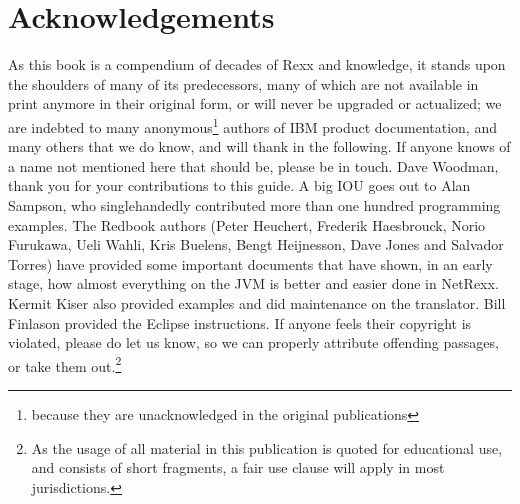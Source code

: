 \section*{Acknowledgements}
As this book is a compendium of decades of Rexx and \nr{} knowledge, it stands upon the shoulders of many of its predecessors, many of which are not available in print anymore in their original form, or will never be upgraded or actualized; we are indebted to many anonymous\footnote{because they are unacknowledged in the original publications} authors of IBM product documentation, and many others that we do know, and will thank in the following. If anyone knows of a name not mentioned here that should be, please be in touch. 
Dave Woodman, thank you for your contributions to this guide.
A big IOU goes out to Alan Sampson, who singlehandedly contributed more than one hundred \nr{} programming examples. The Redbook authors (Peter Heuchert, Frederik Haesbrouck, Norio Furukawa, Ueli Wahli, Kris Buelens, Bengt Heijnesson, Dave Jones and Salvador Torres) have provided some important documents that have shown, in an early stage, how almost everything on the JVM is better and easier done in NetRexx. Kermit Kiser also provided examples and did maintenance on the translator. Bill Finlason provided the Eclipse instructions. If anyone feels their copyright is violated, please do let us know, so we can properly attribute offending passages, or take them out.\footnote{As the usage of all material in this publication is quoted for educational use, and consists of short fragments, a fair use clause will apply in most jurisdictions.}

